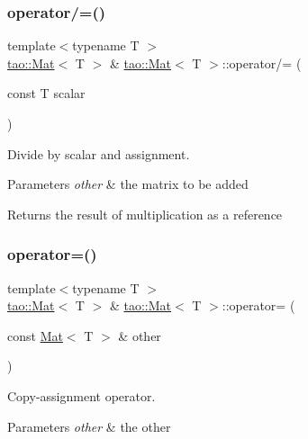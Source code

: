 \subsubsection{\texorpdfstring{operator/=()}{operator/=()}\hspace{0.1cm}{\footnotesize\ttfamily [2/2]}}
{\footnotesize\ttfamily template$<$typename T $>$ \\
\mbox{\hyperlink{classtao_1_1_mat}{tao\+::\+Mat}}$<$ T $>$ \& \mbox{\hyperlink{classtao_1_1_mat}{tao\+::\+Mat}}$<$ T $>$\+::operator/= (\begin{DoxyParamCaption}\item[{const T}]{scalar }\end{DoxyParamCaption})}



Divide by scalar and assignment. 


\begin{DoxyParams}{Parameters}
{\em other} & the matrix to be added \\
\hline
\end{DoxyParams}
\begin{DoxyReturn}{Returns}
the result of multiplication as a reference 
\end{DoxyReturn}
\mbox{\label{classtao_1_1_mat_adf9adc1479a4276601212e9399b18776}} 
\subsubsection{\texorpdfstring{operator=()}{operator=()}}
{\footnotesize\ttfamily template$<$typename T $>$ \\
\mbox{\hyperlink{classtao_1_1_mat}{tao\+::\+Mat}}$<$ T $>$ \& \mbox{\hyperlink{classtao_1_1_mat}{tao\+::\+Mat}}$<$ T $>$\+::operator= (\begin{DoxyParamCaption}\item[{const \mbox{\hyperlink{classtao_1_1_mat}{Mat}}$<$ T $>$ \&}]{other }\end{DoxyParamCaption})}



Copy-\/assignment operator. 


\begin{DoxyParams}{Parameters}
{\em other} & the other \\
\hline
\end{DoxyParams}
\mbox{\label{classtao_1_1_mat_a81150ed4254e70ab1f3058f159ad2218}} 
